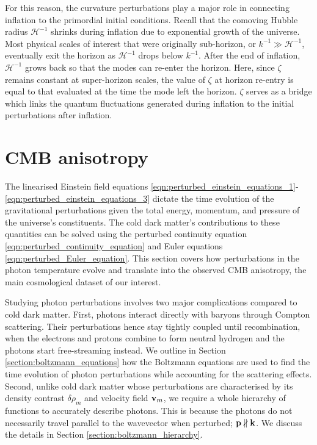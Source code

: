For this reason, the curvature perturbations play a major role in connecting inflation to the primordial initial conditions. Recall that the comoving Hubble radius $\mathcal{H}^{-1}$ shrinks during inflation due to exponential growth of the universe. Most physical scales of interest that were originally sub-horizon, or $k^{-1}\gg \mathcal{H}^{-1}$, eventually exit the horizon as $\mathcal{H}^{-1}$ drops below $k^{-1}$. After the end of inflation, $\mathcal{H}^{-1}$ grows back so that the modes can re-enter the horizon. Here, since $\zeta$ remains constant at super-horizon scales, the value of $\zeta$ at horizon re-entry is equal to that evaluated at the time the mode left the horizon. $\zeta$ serves as a bridge which links the quantum fluctuations generated during inflation to the initial perturbations after inflation.


\section{CMB anisotropy} \label{section:CMB_anisotropy}

The linearised Einstein field equations \eqref{eqn:perturbed_einstein_equations_1}-\eqref{eqn:perturbed_einstein_equations_3} dictate the time evolution of the gravitational perturbations given the total energy, momentum, and pressure of the universe's constituents. The cold dark matter's contributions to these quantities can be solved using the perturbed continuity equation \eqref{eqn:perturbed_continuity_equation} and Euler equations \eqref{eqn:perturbed_Euler_equation}. This section covers how perturbations in the photon temperature evolve and translate into the observed CMB anisotropy, the main cosmological dataset of our interest.

Studying photon perturbations involves two major complications compared to cold dark matter. First, photons interact directly with baryons through Compton scattering. Their perturbations hence stay tightly coupled until recombination, when the electrons and protons combine to form neutral hydrogen and the photons start free-streaming instead. We outline in Section \ref{section:boltzmann_equations} how the Boltzmann equations are used to find the time evolution of photon perturbations while accounting for the scattering effects. Second, unlike cold dark matter whose perturbations are characterised by its density contrast $\delta\rho_m$ and velocity field $\mathbf{v}_m$, we require a whole hierarchy of functions to accurately describe photons. This is because the photons do not necessarily travel parallel to the wavevector when perturbed; $\mathbf{p} \nparallel \mathbf{k}$. We discuss the details in Section \ref{section:boltzmann_hierarchy}.


